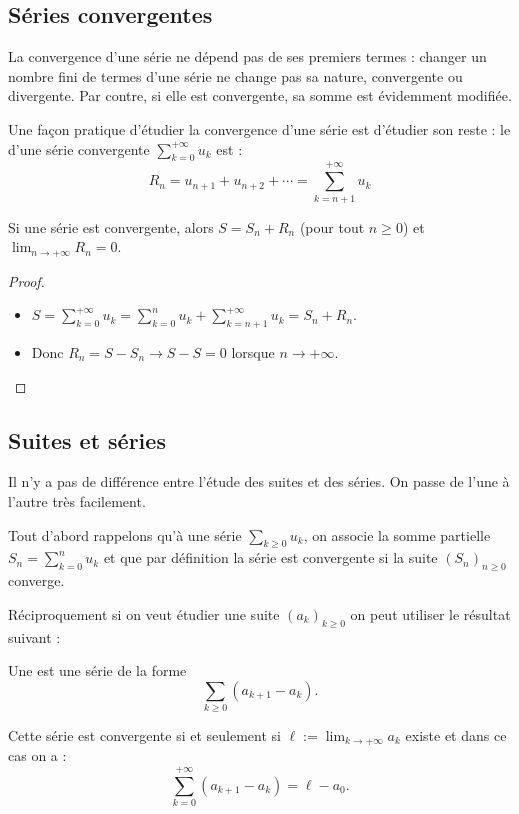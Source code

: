\documentclass[class=report,crop=false]{standalone}
\begin{document}
\subsection{Séries convergentes}

La convergence d'une série ne dépend pas de ses premiers termes : 
changer un nombre fini de termes d'une
série ne change pas sa nature, convergente ou divergente. 
Par contre, si elle est convergente, sa somme est évidemment modifiée.


Une façon pratique d'étudier la convergence d'une série est d'étudier son reste :
le  d'une série convergente $\sum_{k = 0}^{+\infty} u_k$ est :
$$R_n = u_{n+1}+u_{n+2}+\cdots = \sum_{k=n+1}^{+\infty} u_k$$

\begin{proposition}
Si une série est convergente, alors 
$S=S_n+R_n$ (pour tout $n\ge0$) et $\lim_{n\to+\infty} R_n=0$.
\end{proposition}

\begin{proof}
\begin{itemize}
  \item $S = \sum_{k=0}^{+\infty} u_k =\sum_{k=0}^{n} u_k+ \sum_{k=n+1}^{+\infty} u_k=S_n+R_n$.
  \item Donc $R_n = S-S_n \to S-S =0$ lorsque $n\to+\infty$.
\end{itemize} 
\end{proof}



\subsection{Suites et séries}


Il n'y a pas de différence entre l'étude des suites et des séries. 
On passe de l'une à l'autre très facilement.

Tout d'abord rappelons qu'à une série $\sum_{k \ge 0} u_k$, on associe 
la somme partielle $S_n=\sum_{k=0}^n u_k$ et que par définition
la série est convergente si la suite $(S_n)_{n\ge0}$ converge.



Réciproquement si on veut étudier une suite $(a_k)_{k\ge0}$ on peut utiliser le résultat suivant :
\begin{proposition}
Une  est une série de la forme
$$\sum_{k\ge0} (a_{k+1}-a_k).$$

Cette série est convergente si et seulement si $\ell := \lim_{k\to+\infty} a_k$ existe et dans ce cas
on a :
$$\sum_{k=0}^{+\infty} (a_{k+1}-a_k) = \ell - a_0.$$
\end{proposition}
\end{document}
